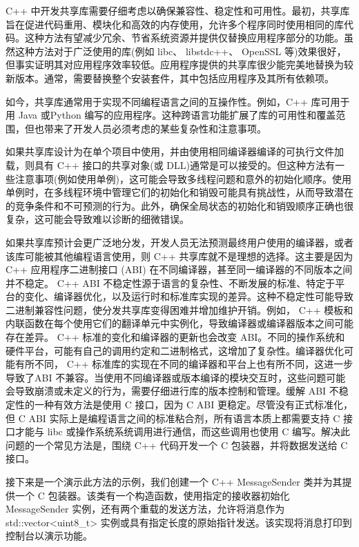 
C++ 中开发共享库需要仔细考虑以确保兼容性、稳定性和可用性。最初，共享库旨在促进代码重用、模块化和高效的内存使用，允许多个程序同时使用相同的库代码。这种方法有望减少冗余、节省系统资源并提供仅替换应用程序部分的功能。虽然这种方法对于广泛使用的库(例如 libc、 libstdc++、 OpenSSL 等)效果很好，但事实证明其对应用程序效率较低。应用程序提供的共享库很少能完美地替换为较新版本。通常，需要替换整个安装套件，其中包括应用程序及其所有依赖项。

如今，共享库通常用于实现不同编程语言之间的互操作性。例如，C++ 库可用于用 Java 或Python 编写的应用程序。这种跨语言功能扩展了库的可用性和覆盖范围，但也带来了开发人员必须考虑的某些复杂性和注意事项。


如果共享库设计为在单个项目中使用，并由使用相同编译器编译的可执行文件加载，则具有 C++ 接口的共享对象(或 DLL)通常是可以接受的。但这种方法有一些注意事项(例如使用单例)，这可能会导致多线程问题和意外的初始化顺序。使用单例时，在多线程环境中管理它们的初始化和销毁可能具有挑战性，从而导致潜在的竞争条件和不可预测的行为。此外，确保全局状态的初始化和销毁顺序正确也很复杂，这可能会导致难以诊断的细微错误。


如果共享库预计会更广泛地分发，开发人员无法预测最终用户使用的编译器，或者该库可能被其他编程语言使用，则 C++ 共享库就不是理想的选择。这主要是因为 C++ 应用程序二进制接口 (ABI) 在不同编译器，甚至同一编译器的不同版本之间并不稳定。 C++ ABI 不稳定性源于语言的复杂性、不断发展的标准、特定于平台的变化、编译器优化，以及运行时和标准库实现的差异。这种不稳定性可能导致二进制兼容性问题，使分发共享库变得困难并增加维护开销。例如， C++ 模板和内联函数在每个使用它们的翻译单元中实例化，导致编译器或编译器版本之间可能存在差异。 C++ 标准的变化和编译器的更新也会改变 ABI。不同的操作系统和硬件平台，可能有自己的调用约定和二进制格式，这增加了复杂性。编译器优化可能有所不同， C++ 标准库的实现在不同的编译器和平台上也有所不同，这进一步导致了ABI 不兼容。当使用不同编译器或版本编译的模块交互时，这些问题可能会导致崩溃或未定义的行为，需要仔细进行库的版本控制和管理。缓解 ABI 不稳定性的一种有效方法是使用 C 接口，因为 C ABI 更稳定。尽管没有正式标准化，但 C ABI 实际上是编程语言之间的标准粘合剂，所有语言本质上都需要支持 C 接口才能与 libc 或操作系统系统调用进行通信，而这些调用也使用 C 编写。解决此问题的一个常见方法是，围绕 C++ 代码开发一个 C 包装器，并将数据发送给 C 接口。


接下来是一个演示此方法的示例，我们创建一个 C++ MessageSender 类并为其提供一个 C 包装器。该类有一个构造函数，使用指定的接收器初始化 MessageSender 实例，还有两个重载的发送方法，允许将消息作为 std::vector<uint8\_t> 实例或具有指定长度的原始指针发送。该实现将消息打印到控制台以演示功能。

